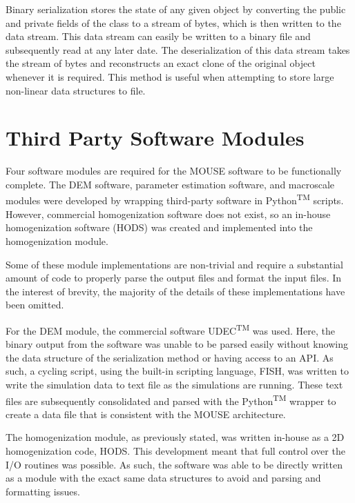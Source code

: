 Binary serialization stores the state of any given object by converting the public and private fields of the class to a stream of bytes, which is then written to the data stream. This data stream can easily be written to a binary file and subsequently read at any later date. The deserialization of this data stream takes the stream of bytes and reconstructs an exact clone of the original object whenever it is required. This method is useful when attempting to store large non-linear data structures to file.


\section{Third Party Software Modules}

Four software modules are required for the MOUSE software to be functionally complete. The DEM software, parameter estimation software, and macroscale modules were developed by wrapping third-party software in Python\textsuperscript{TM} scripts. However, commercial homogenization software does not exist, so an in-house homogenization software (HODS) was created and implemented into the homogenization module.

Some of these module implementations are non-trivial and require a substantial amount of code to properly parse the output files and format the input files. In the interest of brevity, the majority of the details of these implementations have been omitted. 

For the DEM module, the commercial software UDEC\textsuperscript{TM} was used. Here, the binary output from the software was unable to be parsed easily without knowing the data structure of the serialization method or having access to an API. As such, a cycling script, using the built-in scripting language, FISH, was written to write the simulation data to text file as the simulations are running. These text files are subsequently consolidated and parsed with the Python\textsuperscript{TM} wrapper to create a data file that is consistent with the MOUSE architecture. 

The homogenization module, as previously stated, was written in-house as a 2D homogenization code, HODS. This development meant that full control over the I/O routines was possible. As such, the software was able to be directly written as a module with the exact same data structures to avoid and parsing and formatting issues.

